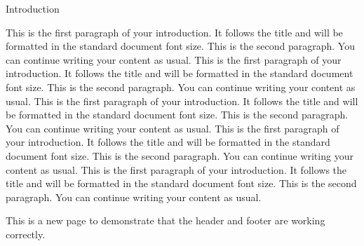 \documentclass{article}
\begin{document}
\begin{center}
\Huge Introduction
\end{center}

This is the first paragraph of your introduction. It follows the title and will be formatted in the standard document font size.
This is the second paragraph. You can continue writing your content as usual.
This is the first paragraph of your introduction. It follows the title and will be formatted in the standard document font size.
This is the second paragraph. You can continue writing your content as usual.
This is the first paragraph of your introduction. It follows the title and will be formatted in the standard document font size.
This is the second paragraph. You can continue writing your content as usual.
This is the first paragraph of your introduction. It follows the title and will be formatted in the standard document font size.
This is the second paragraph. You can continue writing your content as usual.
This is the first paragraph of your introduction. It follows the title and will be formatted in the standard document font size.
This is the second paragraph. You can continue writing your content as usual.

\newpage %

This is a new page to demonstrate that the header and footer are working correctly.
\end{document}

